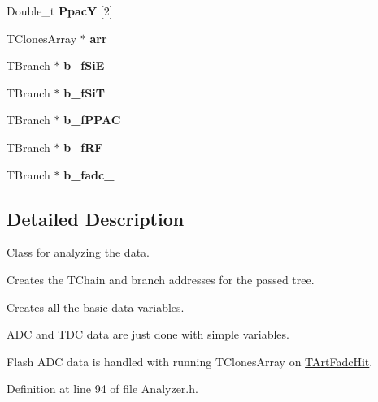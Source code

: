 \begin{DoxyCompactItemize}
\item 
\hypertarget{classAnalyzer_a5599cd6030beabdedfe4fb07718d405b}{
Double\_\-t {\bfseries PpacY} \mbox{[}2\mbox{]}}
\label{classAnalyzer_a5599cd6030beabdedfe4fb07718d405b}

\item 
\hypertarget{classAnalyzer_ada10ed71c3b2bed5b2fd1bea1437b256}{
TClonesArray $\ast$ {\bfseries arr}}
\label{classAnalyzer_ada10ed71c3b2bed5b2fd1bea1437b256}

\item 
\hypertarget{classAnalyzer_ad2ad973fb1bd3ebc6ad59dbe9de15c32}{
TBranch $\ast$ {\bfseries b\_\-fSiE}}
\label{classAnalyzer_ad2ad973fb1bd3ebc6ad59dbe9de15c32}

\item 
\hypertarget{classAnalyzer_ada565a27c5bab718465f3420f466a8a8}{
TBranch $\ast$ {\bfseries b\_\-fSiT}}
\label{classAnalyzer_ada565a27c5bab718465f3420f466a8a8}

\item 
\hypertarget{classAnalyzer_af54978643fb7aeb76b3acc9803626f06}{
TBranch $\ast$ {\bfseries b\_\-fPPAC}}
\label{classAnalyzer_af54978643fb7aeb76b3acc9803626f06}

\item 
\hypertarget{classAnalyzer_af0bcede88021797829ce5ae72373a206}{
TBranch $\ast$ {\bfseries b\_\-fRF}}
\label{classAnalyzer_af0bcede88021797829ce5ae72373a206}

\item 
\hypertarget{classAnalyzer_ad0159e5750015bcd7c814d01769a589d}{
TBranch $\ast$ {\bfseries b\_\-fadc\_\-}}
\label{classAnalyzer_ad0159e5750015bcd7c814d01769a589d}

\end{DoxyCompactItemize}


\subsection{Detailed Description}
Class for analyzing the data. 

Creates the TChain and branch addresses for the passed tree.\par
 Creates all the basic data variables.\par
 ADC and TDC data are just done with simple variables.\par
 Flash ADC data is handled with running TClonesArray on \hyperlink{classTArtFadcHit}{TArtFadcHit}.\par
 

Definition at line 94 of file Analyzer.h.



